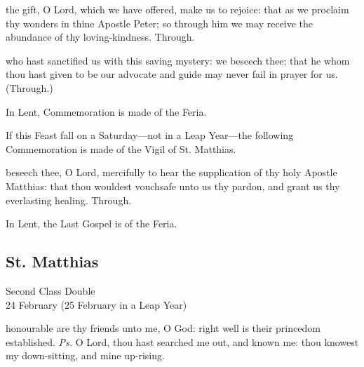 \postcommunion
{} the gift, O Lord, which we have offered, make us to rejoice: that as we proclaim thy wonders in thine Apostle Peter; so through him we may receive the abundance of thy loving-kindness. Through.

 who hast sanctified us with this saving mystery: we beseech thee; that he whom thou hast given to be our advocate and guide may never fail in prayer for us. (Through.)
\begin{rubric}
    In Lent, Commemoration is made of the Feria.%
\end{rubric}
\begin{rubric}
    If this Feast fall on a Saturday---not in a Leap Year---the following Commemoration is made of the Vigil of St. Matthias.
\end{rubric}

 beseech thee, O Lord, mercifully to hear the supplication of thy holy Apostle Matthias: that thou wouldest vouchsafe unto us thy pardon, and grant us thy everlasting healing. Through.
\begin{rubric}
    In Lent, the Last Gospel is of the Feria.
\end{rubric}


\clearpage
\subsection{St. Matthias}
\begin{inhead}
    {Second Class Double\\
24 February (25 February in a Leap Year)}
\end{inhead}

\introit
{} honourable are thy friends unto me, O God: right well is their princedom established. \textit{Ps.} O Lord, thou hast searched me out, and known me: thou knowest my down-sitting, and mine up-rising.

